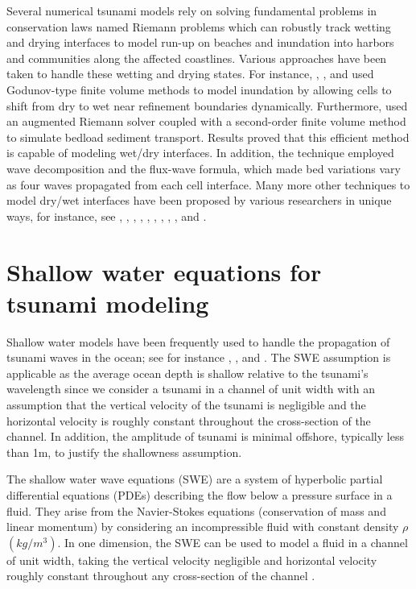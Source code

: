\documentclass[10pt,a4paper]{article}
\begin{document}
	Several numerical tsunami models rely on solving fundamental problems in conservation laws named Riemann problems which can robustly track wetting and drying interfaces to model run-up on beaches and inundation into harbors and communities along the affected coastlines.  Various approaches have been taken to handle these wetting and drying states. For instance,   \citet{ge:2011}, \citet{li-ta-wa-ca-ba-ch-li:2021}, and \citet{fivser2016mass} used Godunov-type finite volume methods to model inundation by allowing cells to shift from dry to wet near refinement boundaries dynamically. Furthermore,   \citet{barzgaran2019numerical}  used an augmented Riemann solver coupled with a second-order finite volume method to simulate bedload sediment transport. Results proved that this efficient method is capable of modeling wet/dry interfaces.  In addition, the technique employed wave decomposition and the flux-wave formula, which made bed variations vary as four waves propagated from each cell interface. Many more other techniques to model dry/wet interfaces have been proposed by various researchers in unique ways, for instance, see   \citet{po:2015}, \citet{po:2018}, \citet{pe-bo-ma:2011}, \citet{toro2001shock}, \citet{chaabelasri1849simple}, \citet{nikolos2009unstructured}, \citet{huang2013well}, \citet{bi2014finite}, \citet{song2011unstructured}, and \citet{buttinger2019fast}.
	
	
	\section{Shallow water equations for tsunami modeling}
	\label{sec2}
	Shallow water models have been frequently used to handle the propagation of tsunami waves in the ocean; see for instance   \citet{dutykh2007water}, \citet{le-ge-be:2011}, and \citet{dias2007dynamics}. The SWE assumption is applicable as the average ocean depth is shallow relative to the tsunami's wavelength since we consider a tsunami in a channel of unit width with an assumption that the vertical velocity of the tsunami  is negligible and the horizontal velocity is roughly constant throughout the cross-section of the channel. In addition, the amplitude of tsunami is minimal offshore, typically less than 1m, to justify the shallowness assumption. 
	
	The shallow water wave equations (SWE) are a system of hyperbolic partial differential equations (PDEs) describing the flow below a pressure surface in a fluid. They arise from the Navier-Stokes equations (conservation of mass and linear momentum) by considering an incompressible fluid with constant density $\rho$ $(kg/m^{3})$.  In one dimension, the SWE  can be used to model a fluid in a channel of unit width, taking the vertical velocity negligible and horizontal velocity roughly constant throughout any cross-section of the channel \citep{ge:2008}.  
	
\end{document}
